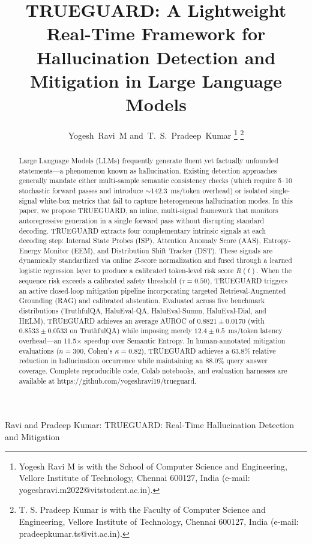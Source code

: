 \documentclass[journal]{IEEEtran}
\begin{document}
\title{TRUEGUARD: A Lightweight Real-Time Framework for Hallucination Detection and Mitigation in Large Language Models}

\author{Yogesh~Ravi~M and~T.~S.~Pradeep~Kumar%
\thanks{Yogesh Ravi M is with the School of Computer Science and Engineering, Vellore Institute of Technology, Chennai 600127, India (e-mail: yogeshravi.m2022@vitstudent.ac.in).}%
\thanks{T. S. Pradeep Kumar is with the Faculty of Computer Science and Engineering, Vellore Institute of Technology, Chennai 600127, India (e-mail: pradeepkumar.ts@vit.ac.in).}%
}

%
{Ravi and Pradeep Kumar: TRUEGUARD: Real-Time Hallucination Detection and Mitigation}

\maketitle

\begin{abstract}
Large Language Models (LLMs) frequently generate fluent yet factually unfounded statements---a phenomenon known as hallucination. Existing detection approaches generally mandate either multi-sample semantic consistency checks (which require 5--10 stochastic forward passes and introduce $\sim$142.3~ms/token overhead) or isolated single-signal white-box metrics that fail to capture heterogeneous hallucination modes. In this paper, we propose TRUEGUARD, an inline, multi-signal framework that monitors autoregressive generation in a single forward pass without disrupting standard decoding. TRUEGUARD extracts four complementary intrinsic signals at each decoding step: Internal State Probes (ISP), Attention Anomaly Score (AAS), Entropy-Energy Monitor (EEM), and Distribution Shift Tracker (DST). These signals are dynamically standardized via online $Z$-score normalization and fused through a learned logistic regression layer to produce a calibrated token-level risk score $R(t)$. When the sequence risk exceeds a calibrated safety threshold ($\tau = 0.50$), TRUEGUARD triggers an active closed-loop mitigation pipeline incorporating targeted Retrieval-Augmented Grounding (RAG) and calibrated abstention. Evaluated across five benchmark distributions (TruthfulQA, HaluEval-QA, HaluEval-Summ, HaluEval-Dial, and HELM), TRUEGUARD achieves an average AUROC of $0.8821 \pm 0.0170$ (with $0.8533 \pm 0.0533$ on TruthfulQA) while imposing merely $12.4 \pm 0.5$~ms/token latency overhead---an 11.5$\times$ speedup over Semantic Entropy. In human-annotated mitigation evaluations ($n = 300$, Cohen's $\kappa = 0.82$), TRUEGUARD achieves a 63.8\% relative reduction in hallucination occurrence while maintaining an 88.0\% query answer coverage. Complete reproducible code, Colab notebooks, and evaluation harnesses are available at https://github.com/yogeshravi19/trueguard.
\end{abstract}
\end{document}
